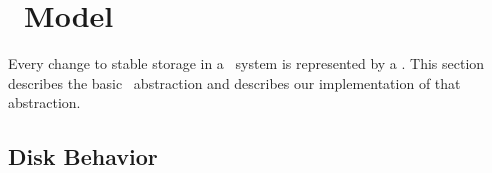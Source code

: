 
\section{\Patch\ Model}
\label{sec:patch}

\makeatletter
\let\emptyset\varnothing
\newcommand{\PBlock}[1]{\ensuremath{B[{#1}]}}
\newcommand{\PSetlim}[1]{\def\@next{#1}\ifx\@next\@empty\else_{\@next}\fi}
\newcommand{\PMem}[1][]{\ensuremath{\mathpatchset{U}\PSetlim{#1}}}
\newcommand{\PInf}[1][]{\ensuremath{\mathpatchset{F}\PSetlim{#1}}}
\newcommand{\PDisk}[1][]{\ensuremath{\mathpatchset{C}\PSetlim{#1}}}
\newcommand{\PHard}[1][]{\ensuremath{\textit{\Nrb}\PSetlim{#1}}}
\newcommand{\PSoft}[1][]{\ensuremath{\textit{\Rb}\PSetlim{#1}}}
\newcommand{\PEmpty}[1][]{\ensuremath{\textit{\Noop}\PSetlim{#1}}}
\newcommand{\PDDepset}[1]{\ensuremath{\textit{dep}_1[#1]}}
\newcommand{\PDepend}{\ensuremath{\leadsto}}
\newcommand{\PDDepend}{\ensuremath{\rightarrow}}
\newcommand{\PDepset}[1]{\ensuremath{\textit{dep}[#1]}}
\newcommand{\PRDepset}[1]{\ensuremath{\textit{RDep}[#1]}}
\makeatother

Every change to stable storage in a \Kudos\ system is represented by a
\emph{\patch}.
%
This section describes the basic \patch\ abstraction
 and describes our implementation of that abstraction.

\begin{comment}
%
%
Each \patch\ $p$ encapsulates four important pieces of information: its
 \emph{block}, its \emph{state}, a set of \emph{direct dependencies}, and
 some \emph{undo data}.
\end{comment}

\subsection{Disk Behavior}

